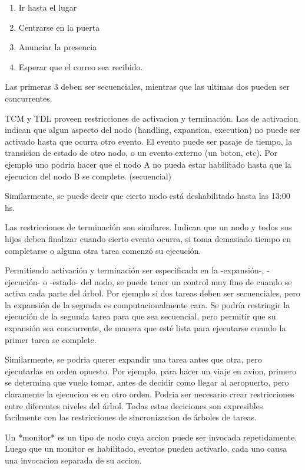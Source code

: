 \documentclass[a4paper, 11pt, oneside]{article}
\begin{document}
\begin{enumerate}
\item Ir hasta el lugar
\item Centrarse en la puerta
\item Anunciar la presencia
\item Esperar que el correo sea recibido.
\end{enumerate}

Las primeras 3 deben ser secuenciales, mientras que las ultimas dos pueden 
ser concurrentes.

TCM y TDL proveen restricciones de activacion y terminación.
Las de activacion indican que algun aspecto del nodo (handling, 
expansion, execution) no puede
ser activado hasta que ocurra otro evento. 
El evento puede ser pasaje de tiempo, la transicion de estado de otro nodo,
o un evento externo (un boton, etc).
Por ejemplo uno podria hacer que el nodo A no pueda estar habilitado hasta 
que la ejecucion del nodo B se complete. (secuencial)

Similarmente, se puede decir que cierto nodo está deshabilitado hasta las
13:00 hs.

Las restricciones de terminación son similares. Indican que un nodo y todos 
sus hijos deben finalizar cuando cierto evento ocurra, si
toma demasiado tiempo en completarse o alguna otra tarea comenzó su ejecución.

Permitiendo activación y terminación ser especificada en la -expansión-, 
-ejecución- o -estado- del nodo, se puede tener un control
muy fino de cuando se activa cada parte del árbol.
Por ejemplo si dos tareas deben ser secuenciales, pero la expansión de la 
segunda es computacionalmente cara. Se podría
restringir la ejecución de la segunda tarea para que sea secuencial, pero 
permitir que su expansión sea concurrente, de manera
que esté lista para ejecutarse cuando la primer tarea se complete.

Similarmente, se podria querer expandir una tarea antes que otra, pero 
ejecutarlas en orden opuesto. Por ejemplo, para hacer un
viaje en avion, primero se determina que vuelo tomar, antes de decidir como 
llegar al aeropuerto, pero claramente la ejecucion es en otro orden.
Podria ser necesario crear restricciones entre diferentes niveles del árbol.
Todas estas deciciones son expresibles facilmente con las restricciones de 
sincronizacion de árboles de tareas.


Un *monitor* es un tipo de nodo cuya accion puede ser invocada repetidamente. 
Luego que un monitor es habilitado, eventos
pueden activarlo, cada uno causa una invocacion separada de su accion.
\end{document}
